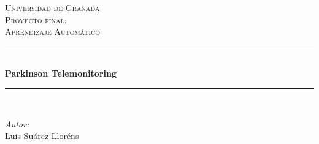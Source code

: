 \begin{titlepage}

\newcommand{\HRule}{\rule{\linewidth}{0.5mm}} %

\center %
 

\textsc{\LARGE Universidad de Granada}\\[1.5cm] %
\textsc{\Large Proyecto final:}\\[0.5cm] %
\textsc{\large Aprendizaje Automático}\\[0.5cm] %


\HRule \\[0.4cm]
{ \huge \bfseries Parkinson Telemonitoring}\\[0.4cm] %
\HRule \\[1.5cm]
 

\begin{minipage}{0.4\textwidth}
\begin{flushleft} \large
\emph{Autor:}\\
Luis Suárez Lloréns %
\end{flushleft}
\end{minipage}
~
\begin{minipage}{0.4\textwidth}
\begin{flushright} \large
\end{flushright}
\end{minipage}\\[4cm]



\end{titlepage}
